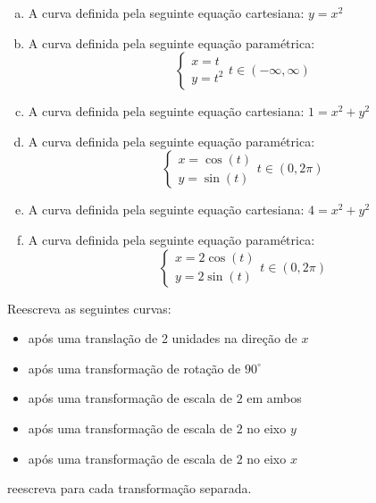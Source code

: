 \documentclass[12pt]{exam}
\begin{document}
\begin{questions}
\begin{enumerate}[a)]
\item A curva definida pela seguinte equação cartesiana: $y = x^2$

\item A curva definida pela seguinte equação paramétrica: 
\[\begin{cases}
    x=t\\
    y=t^2
\end{cases}
t\in (-\infty,\infty)\]

\item A curva definida pela seguinte equação cartesiana: $1 = x^2 + y^2$

\item A curva definida pela seguinte equação paramétrica: 
\[\begin{cases}
    x=\cos (t)\\
    y=\sin (t)
\end{cases}
t\in (0, 2\pi)\]

\item A curva definida pela seguinte equação cartesiana: $4 = x^2 + y^2$

\item A curva definida pela seguinte equação paramétrica: 
\[\begin{cases}
    x=2\cos (t)\\
    y=2\sin (t)
\end{cases}
t\in (0, 2\pi)\]

\end{enumerate}

\break

\question Reescreva as seguintes curvas:

\begin{itemize}

\item após uma translação de 2 unidades na direção de $x$

\item após uma transformação de rotação de $90^\circ$

\item após uma transformação de escala de $2$ em ambos

\item após uma transformação de escala de $2$ no eixo $y$

\item após uma transformação de escala de $2$ no eixo $x$

\end{itemize}

reescreva para cada transformação separada.


\end{questions}
\end{document}
